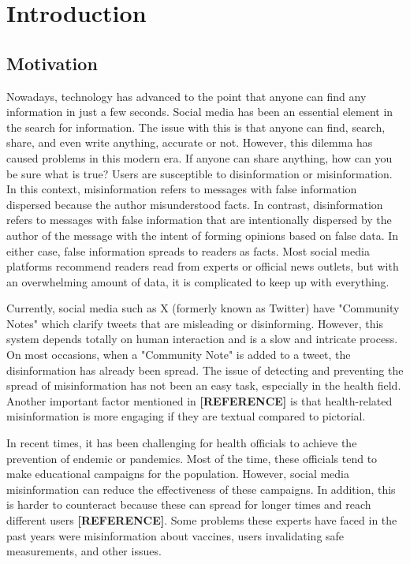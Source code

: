 

\chapter{Introduction}

\section{Motivation}

\noindent 	Nowadays, technology has advanced to the point that anyone can find any information in just a few seconds. Social media has been an essential element
in the search for information. The issue with this is that anyone can find, search, share, and even write anything, accurate or not. However, this dilemma has caused
problems in this modern era. If anyone can share anything, how can you be sure what is true? Users are susceptible to disinformation or misinformation. In this context,
misinformation refers to messages with false information dispersed because the author misunderstood facts. In contrast, disinformation refers to messages with false information
that are intentionally dispersed by the author of the message with the intent of forming opinions based on false data. In either case, false information spreads to readers as
facts. Most social media platforms recommend readers read from experts or official news outlets, but with an overwhelming amount of data, it is complicated to keep up with everything.

Currently, social media such as X (formerly known as Twitter) have "Community Notes" which clarify tweets that are misleading or disinforming. However, this system
depends totally on human interaction and is a slow and intricate process. On most occasions, when a "Community Note" is added to a tweet, the disinformation has
already been spread. The issue of detecting and preventing the spread of misinformation has not been an easy task, especially in the health field. Another important
factor mentioned in \textbf{[REFERENCE]} is that health-related misinformation is more engaging if they are textual compared to pictorial. 

In recent times, it has been challenging for health officials to achieve the prevention of endemic or pandemics. Most of the time, these officials tend to make educational
campaigns for the population. However, social media misinformation can reduce the effectiveness of these campaigns. In addition, this is harder to counteract because
these can spread for longer times and reach different users \textbf{[REFERENCE]}. Some problems these experts have faced in the past years were misinformation
about vaccines, users invalidating safe measurements, and other issues.

